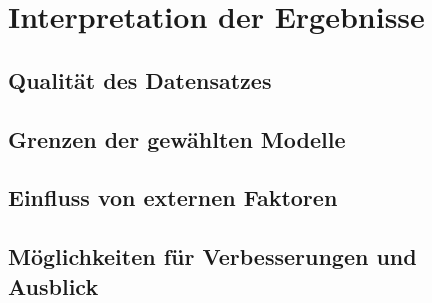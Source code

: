 \newpage

\section{Interpretation der Ergebnisse}
\label{sec:interpretation}


\subsection{Qualität des Datensatzes}
\label{subsec:grenzen}

\subsection{Grenzen der gewählten Modelle}
\label{subsec:grenzen}

\subsection{Einfluss von externen Faktoren}
\label{subsec:einfluss}

\subsection{Möglichkeiten für Verbesserungen und Ausblick}
\label{subsec:ausblick}